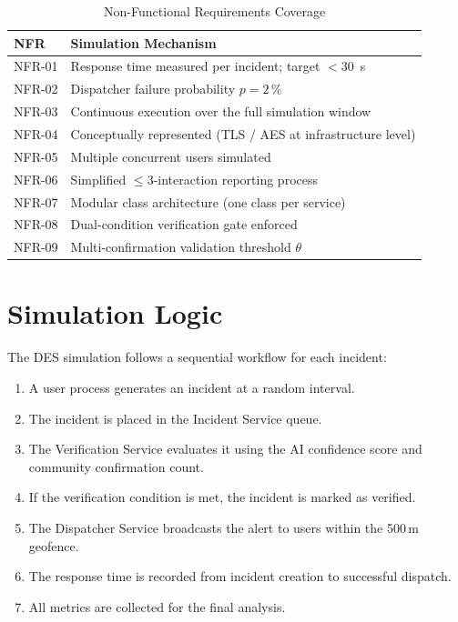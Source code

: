 \documentclass[conference,a4paper,10pt]{IEEEtran}
\begin{document}
\begin{table}[H]
\caption{Non-Functional Requirements Coverage}
\label{tab:nfr}\centering\small
\begin{tabular}{ll}
\toprule
\textbf{NFR} & \textbf{Simulation Mechanism}\\
\midrule
NFR-01 & Response time measured per incident; target $< 30$~s\\
NFR-02 & Dispatcher failure probability $p = 2\,\%$\\
NFR-03 & Continuous execution over the full simulation window\\
NFR-04 & Conceptually represented (TLS / AES at infrastructure level)\\
NFR-05 & Multiple concurrent users simulated\\
NFR-06 & Simplified $\leq 3$-interaction reporting process\\
NFR-07 & Modular class architecture (one class per service)\\
NFR-08 & Dual-condition verification gate enforced\\
NFR-09 & Multi-confirmation validation threshold $\theta$\\
\bottomrule
\end{tabular}
\end{table}

\section{Simulation Logic}

The DES simulation follows a sequential workflow for each incident:

\begin{enumerate}
  \item A user process generates an incident at a random interval.
  \item The incident is placed in the Incident Service queue.
  \item The Verification Service evaluates it using the AI confidence
    score and community confirmation count.
  \item If the verification condition is met, the incident is marked
    as verified.
  \item The Dispatcher Service broadcasts the alert to users within
    the 500\,m geofence.
  \item The response time is recorded from incident creation to
    successful dispatch.
  \item All metrics are collected for the final analysis.
\end{enumerate}
\end{document}
